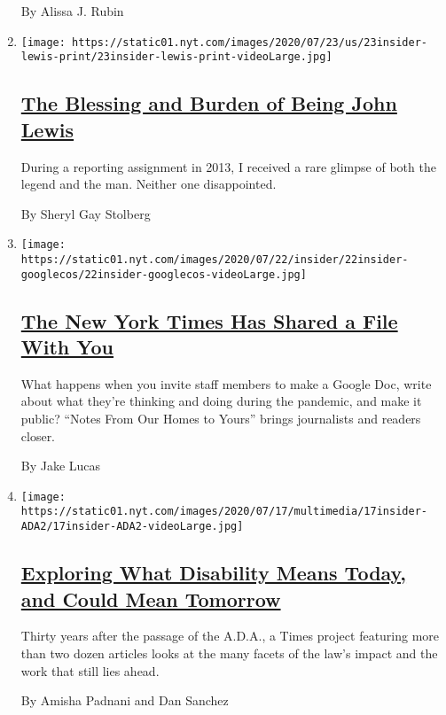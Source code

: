 \begin{enumerate}
  By Alissa J. Rubin
\item
  \texttt{[image: https://static01.nyt.com/images/2020/07/23/us/23insider-lewis-print/23insider-lewis-print-videoLarge.jpg]}

  \hypertarget{the-blessing-and-burden-of-being-john-lewis}{%
  \subsection{\texorpdfstring{\href{/2020/07/23/insider/john-lewis-memory.html}{The
  Blessing and Burden of Being John
  Lewis}}{The Blessing and Burden of Being John Lewis}}\label{the-blessing-and-burden-of-being-john-lewis}}

  During a reporting assignment in 2013, I received a rare glimpse of
  both the legend and the man. Neither one disappointed.

  By Sheryl Gay Stolberg
\item
  \texttt{[image: https://static01.nyt.com/images/2020/07/22/insider/22insider-googlecos/22insider-googlecos-videoLarge.jpg]}

  \hypertarget{the-new-york-times-has-shared-a-file-with-you}{%
  \subsection{\texorpdfstring{\href{/2020/07/21/insider/new-york-times-google-docs.html}{The
  New York Times Has Shared a File With
  You}}{The New York Times Has Shared a File With You}}\label{the-new-york-times-has-shared-a-file-with-you}}

  What happens when you invite staff members to make a Google Doc, write
  about what they're thinking and doing during the pandemic, and make it
  public? ``Notes From Our Homes to Yours'' brings journalists and
  readers closer.

  By Jake Lucas
\item
  \texttt{[image: https://static01.nyt.com/images/2020/07/17/multimedia/17insider-ADA2/17insider-ADA2-videoLarge.jpg]}

  \hypertarget{exploring-what-disability-means-today-and-could-mean-tomorrow}{%
  \subsection{\texorpdfstring{\href{/2020/07/20/insider/disability-ADA.html}{Exploring
  What Disability Means Today, and Could Mean
  Tomorrow}}{Exploring What Disability Means Today, and Could Mean Tomorrow}}\label{exploring-what-disability-means-today-and-could-mean-tomorrow}}

  Thirty years after the passage of the A.D.A., a Times project
  featuring more than two dozen articles looks at the many facets of the
  law's impact and the work that still lies ahead.

  By Amisha Padnani and Dan Sanchez
\end{enumerate}


